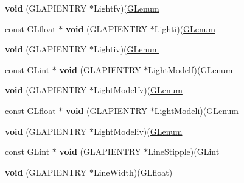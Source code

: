 \begin{DoxyCompactItemize}
{\bfseries void} (G\+L\+A\+P\+I\+E\+N\+T\+RY $\ast$Lightfv)(\hyperlink{interfacevoid}{G\+Lenum}
\item 
\mbox{\label{struct_____g_ldispatch_table_rec_a792feeee4688abf0d520a15121c0c21e}} 
const G\+Lfloat $\ast$ {\bfseries void} (G\+L\+A\+P\+I\+E\+N\+T\+RY $\ast$Lighti)(\hyperlink{interfacevoid}{G\+Lenum}
\item 
\mbox{\label{struct_____g_ldispatch_table_rec_a5d01bfbdeae6c38ae455a79b1b13192d}} 
{\bfseries void} (G\+L\+A\+P\+I\+E\+N\+T\+RY $\ast$Lightiv)(\hyperlink{interfacevoid}{G\+Lenum}
\item 
\mbox{\label{struct_____g_ldispatch_table_rec_af05bcc3a71195e1f92b388e62a568f06}} 
const G\+Lint $\ast$ {\bfseries void} (G\+L\+A\+P\+I\+E\+N\+T\+RY $\ast$Light\+Modelf)(\hyperlink{interfacevoid}{G\+Lenum}
\item 
\mbox{\label{struct_____g_ldispatch_table_rec_ae0a65118b3c7771a21dee44809c32fc9}} 
{\bfseries void} (G\+L\+A\+P\+I\+E\+N\+T\+RY $\ast$Light\+Modelfv)(\hyperlink{interfacevoid}{G\+Lenum}
\item 
\mbox{\label{struct_____g_ldispatch_table_rec_ac05f9e39764dc24be084f168fe884da9}} 
const G\+Lfloat $\ast$ {\bfseries void} (G\+L\+A\+P\+I\+E\+N\+T\+RY $\ast$Light\+Modeli)(\hyperlink{interfacevoid}{G\+Lenum}
\item 
\mbox{\label{struct_____g_ldispatch_table_rec_a9a17ee35cdb4ad460f5545e29af2e39b}} 
{\bfseries void} (G\+L\+A\+P\+I\+E\+N\+T\+RY $\ast$Light\+Modeliv)(\hyperlink{interfacevoid}{G\+Lenum}
\item 
\mbox{\label{struct_____g_ldispatch_table_rec_a6f226aed8239a321fa18f391f3691404}} 
const G\+Lint $\ast$ {\bfseries void} (G\+L\+A\+P\+I\+E\+N\+T\+RY $\ast$Line\+Stipple)(G\+Lint
\item 
\mbox{\label{struct_____g_ldispatch_table_rec_a7a147a2c673cc3ebfa6696c6d50942d0}} 
{\bfseries void} (G\+L\+A\+P\+I\+E\+N\+T\+RY $\ast$Line\+Width)(G\+Lfloat)

\end{DoxyCompactItemize}
